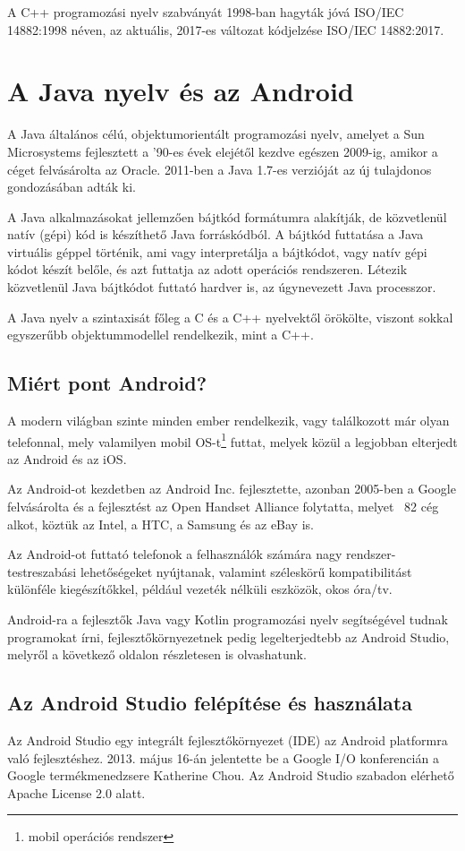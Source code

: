 \documentclass[]{thesis-ekf}
\theoremstyle{definition}
\begin{document}
A C++ programozási nyelv szabványát 1998-ban hagyták jóvá ISO/IEC 14882:1998 néven, az aktuális, 2017-es változat kódjelzése ISO/IEC 14882:2017.
\section{A Java nyelv és az Android}
A Java\cite{Java} általános célú, objektumorientált programozási nyelv, amelyet a Sun Microsystems fejlesztett a ’90-es évek elejétől kezdve egészen 2009-ig, amikor a céget felvásárolta az Oracle. 2011-ben a Java 1.7-es verzióját az új tulajdonos gondozásában adták ki.

A Java alkalmazásokat jellemzően bájtkód formátumra alakítják, de közvetlenül natív (gépi) kód is készíthető Java forráskódból. A bájtkód futtatása a Java virtuális géppel történik, ami vagy interpretálja a bájtkódot, vagy natív gépi kódot készít belőle, és azt futtatja az adott operációs rendszeren. Létezik közvetlenül Java bájtkódot futtató hardver is, az úgynevezett Java processzor.

A Java nyelv a szintaxisát főleg a C és a C++ nyelvektől örökölte, viszont sokkal egyszerűbb objektummodellel rendelkezik, mint a C++.
\subsection{Miért pont Android?}
A modern világban szinte minden ember rendelkezik, vagy találkozott már olyan telefonnal, mely valamilyen mobil OS-t\footnote{mobil operációs rendszer} futtat, melyek közül a legjobban elterjedt az Android\cite{Android} és az iOS.

Az Android-ot kezdetben az Android Inc. fejlesztette, azonban 2005-ben a Google felvásárolta és a fejlesztést az Open Handset Alliance folytatta, melyet ~82 cég alkot, köztük az Intel, a HTC, a Samsung és az eBay is.

Az Android-ot futtató telefonok a felhasználók számára nagy rendszer-testreszabási lehetőségeket nyújtanak, valamint széleskörű kompatibilitást különféle kiegészítőkkel, például vezeték nélküli eszközök, okos óra/tv.

Android-ra a fejlesztők Java vagy Kotlin programozási nyelv segítségével tudnak programokat írni, fejlesztőkörnyezetnek pedig legelterjedtebb az Android Studio, melyről a következő oldalon részletesen is olvashatunk.
\subsection{Az Android Studio felépítése és használata}\label{android-studio}
Az Android Studio\cite{Android} egy integrált fejlesztőkörnyezet (IDE) az Android platformra való fejlesztéshez. 2013. május 16-án jelentette be a Google I/O konferencián a Google termékmenedzsere Katherine Chou. Az Android Studio szabadon elérhető Apache License 2.0 alatt.
\end{document}
